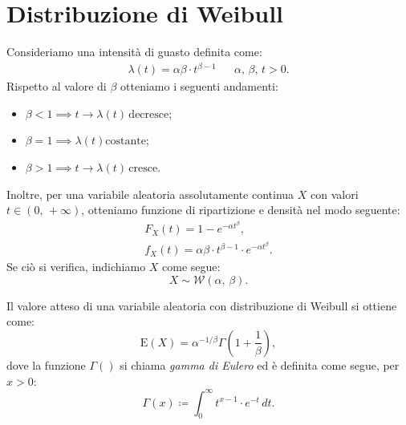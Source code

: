     \section{Distribuzione di Weibull}
        \begin{defn}\label{defn:Distribuzione_Weibull}
            Consideriamo una intensità di guasto definita come:
            \begin{align*}
                \lambda(t) = \alpha\beta \cdot t^{\beta - 1}
                & & \alpha,\, \beta,\, t > 0
            .\end{align*}
            Rispetto al valore di $\beta$ otteniamo i seguenti andamenti:
            \begin{itemize}
                \item $\beta < 1 \implies t \rightarrow \lambda(t)\, \text{decresce}$;
                \item $\beta = 1 \implies \lambda(t) \text{costante}$;
                \item $\beta > 1 \implies t \rightarrow \lambda(t)\, \text{cresce}$.
            \end{itemize}
            Inoltre, per una variabile aleatoria assolutamente continua $X$ con valori $t \in (0,\,+\infty)$, otteniamo funzione di ripartizione e densità nel modo seguente:
            \begin{gather*}
                F_X(t) = 1 - e^{-\alpha t^{\beta}}, \\
                f_X(t) = \alpha\beta \cdot t^{\beta - 1}\cdot e^{-\alpha t^{\beta}}.
            \end{gather*}
            Se ciò si verifica, indichiamo $X$ come segue: \[
                X \sim \mathcal{W}(\alpha,\, \beta)
            .\]
        \end{defn}
        \begin{obsv}
            Il valore atteso di una variabile aleatoria con distribuzione di Weibull si ottiene come: \[
                \text{E}(X) = \alpha ^{-1 /\beta} \Gamma\left(1 + \frac{1}{\beta}\right)
            ,\] dove la funzione $\Gamma()$ si chiama \emph{gamma di Eulero} ed è definita come segue, per $x > 0$: \[
            \Gamma(x) \coloneqq \int_{0}^{\infty} t^{x-1}\cdot e^{-t}\, dt
            .\] 
        \end{obsv}
